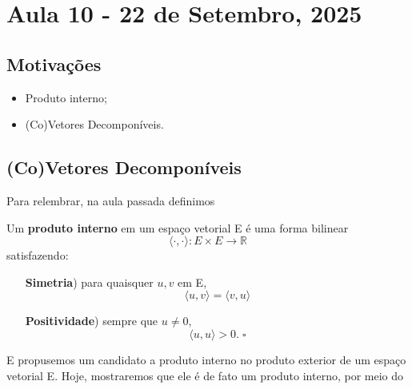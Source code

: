 \documentclass[../differential_forms.tex]{subfiles}
\begin{document}
\section{Aula 10 - 22 de Setembro, 2025}
\subsection{Motivações}
\begin{itemize}
	\item Produto interno;
	\item (Co)Vetores Decomponíveis.
\end{itemize}
\subsection{(Co)Vetores Decomponíveis}
Para relembrar, na aula passada definimos
\begin{def*}
	Um \textbf{produto interno} em um espaço vetorial E é uma forma bilinear
	\[
		\langle \cdot , \cdot  \rangle:E\times E\rightarrow \mathbb{R}
	\]
	satisfazendo:
	\begin{itemize}
		\item[\textbf{Simetria})] para quaisquer \(u, v\) em E,
		      \[
			      \langle u, v \rangle = \langle v, u \rangle
		      \]
		\item[\textbf{Positividade})] sempre que \(u\neq 0\),
		      \[
			      \langle u, u \rangle > 0. \;\square
		      \]
	\end{itemize}
\end{def*}

E propusemos um candidato a produto interno no produto exterior de um espaço vetorial E. Hoje, mostraremos que ele é de fato um produto interno, por meio do
\end{document}
